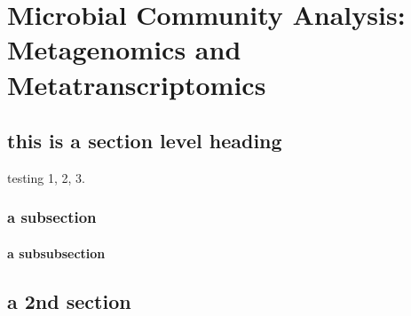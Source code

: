 \chapter{Microbial Community Analysis: Metagenomics and Metatranscriptomics}

\section{this is a section level heading}
testing 1, 2, 3.

\subsection{a subsection}

\subsubsection{a subsubsection}

\section{a 2nd section}



